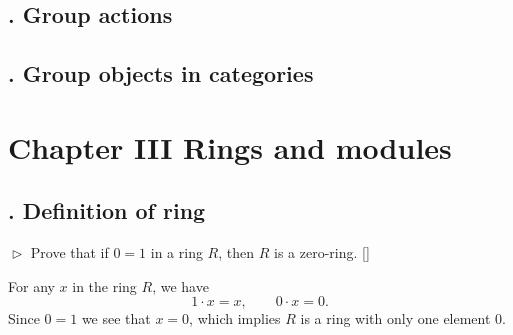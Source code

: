 \documentclass[12pt,letterpaper,boxed]{hmcpset}
\begin{document}
\subsection{. Group actions}

\subsection{. Group objects in categories}

\newpage
\section{Chapter III\hspace{0.2em} Rings and modules}

\subsection{. Definition of ring}
\begin{problem}[1.1]
	$\vartriangleright$ Prove that if $0 = 1$ in a ring $R$, then $R$ is a zero-ring. []
\end{problem}
\begin{solution}
	For any $x$ in the ring $R$, we have
	\[
	1\cdot x=x,\qquad 0\cdot x=0.
	\]
	Since $0 = 1$ we see that $x=0$, which implies $R$ is a ring with only one element $0$.
\end{solution}
\end{document}
